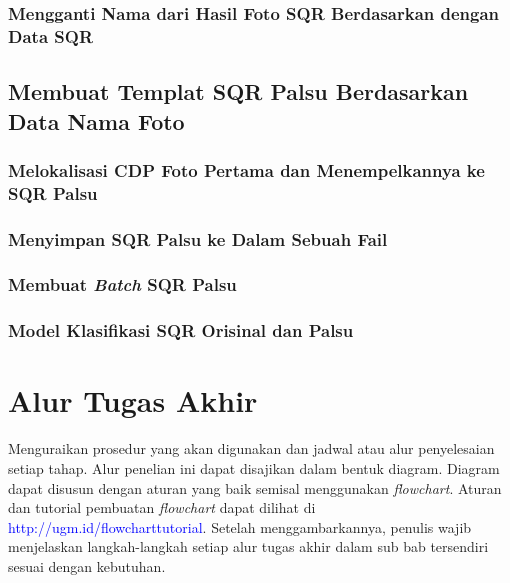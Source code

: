 \subsubsection{Mengganti Nama dari Hasil Foto SQR Berdasarkan dengan Data SQR}

\subsection{Membuat Templat SQR Palsu Berdasarkan Data Nama Foto}

\subsubsection{Melokalisasi CDP Foto Pertama dan Menempelkannya ke SQR Palsu}

\subsubsection{Menyimpan SQR Palsu ke Dalam Sebuah Fail}

\subsubsection{Membuat \emph{Batch} SQR Palsu}

\subsubsection{Model Klasifikasi SQR Orisinal dan Palsu}

\section{Alur Tugas Akhir}

Menguraikan prosedur yang akan digunakan dan jadwal atau alur penyelesaian setiap tahap. Alur penelian ini dapat disajikan dalam bentuk diagram. Diagram dapat
disusun dengan aturan yang baik semisal menggunakan \textit{flowchart}. Aturan dan tutorial pembuatan \textit{flowchart} dapat dilihat di
\textcolor{blue}{http://ugm.id/flowcharttutorial}. Setelah menggambarkannya, penulis wajib menjelaskan langkah-langkah setiap alur tugas akhir dalam sub bab
tersendiri sesuai dengan kebutuhan.